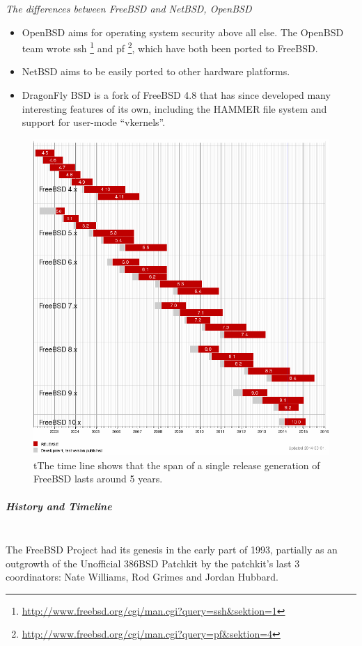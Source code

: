 \documentclass[11pt]{article} %
\begin{document}
\textit{The differences between FreeBSD and NetBSD, OpenBSD}
\begin{itemize}
\item OpenBSD aims for operating system security above all else. The OpenBSD team wrote ssh \footnote{\url {http://www.freebsd.org/cgi/man.cgi?query=ssh&sektion=1}} and pf \footnote{\url{http://www.freebsd.org/cgi/man.cgi?query=pf&sektion=4}}, which have both been ported to FreeBSD.
\item NetBSD aims to be easily ported to other hardware platforms.
\item  DragonFly BSD is a fork of FreeBSD 4.8 that has since developed many interesting features of its own, including the HAMMER file system and support for user-mode “vkernels”.
\end{itemize}
       \begin{figure}
   \centering
        \includegraphics[scale=0.4]{./freebsd.png}
     \caption{ tThe time line shows that the span of a single release generation of FreeBSD lasts around 5 years.}
      \end{figure}


  \subparagraph{History and Timeline} \mbox{} \\
The FreeBSD Project had its genesis in the early part of 1993, partially as an outgrowth of the Unofficial 386BSD Patchkit by the patchkit's last 3 coordinators: Nate Williams, Rod Grimes and Jordan Hubbard.
\end{document}
